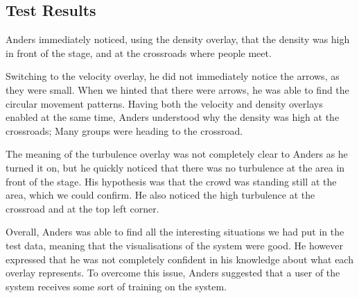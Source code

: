 \subsection{Test Results}
Anders immediately noticed, using the density overlay, that the density was high in front of the stage, and at the crossroads where people meet. 

Switching to the velocity overlay, he did not immediately notice the arrows, as they were small. When we hinted that there were arrows, he was able to find the circular movement patterns. Having both the velocity and density overlays enabled at the same time, Anders understood why the density was high at the crossroads; Many groups were heading to the crossroad.

The meaning of the turbulence overlay was not completely clear to Anders as he turned it on, but he quickly noticed that there was no turbulence at the area in front of the stage. His hypothesis was that the crowd was standing still at the area, which we could confirm. He also noticed the high turbulence at the crossroad and at the top left corner.

Overall, Anders was able to find all the interesting situations we had put in the test data, meaning that the visualisations of the system were good. He however expressed that he was not completely confident in his knowledge about what each overlay represents. To overcome this issue, Anders suggested that a user of the system receives some sort of training on the system.








